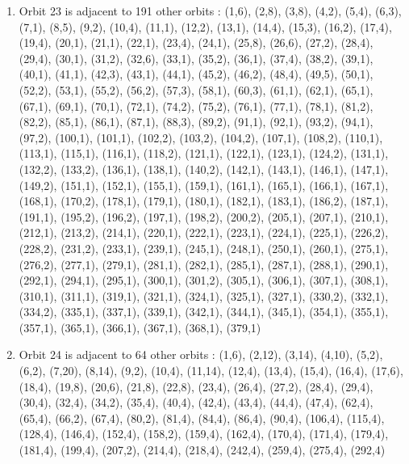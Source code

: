 \documentclass[12pt]{article}
\begin{document}
\begin{enumerate}
\item Orbit 23 is adjacent to 191 other orbits : (1,6), (2,8), (3,8), (4,2), (5,4), (6,3), (7,1), (8,5), (9,2), (10,4), (11,1), (12,2), (13,1), (14,4), (15,3), (16,2), (17,4), (19,4), (20,1), (21,1), (22,1), (23,4), (24,1), (25,8), (26,6), (27,2), (28,4), (29,4), (30,1), (31,2), (32,6), (33,1), (35,2), (36,1), (37,4), (38,2), (39,1), (40,1), (41,1), (42,3), (43,1), (44,1), (45,2), (46,2), (48,4), (49,5), (50,1), (52,2), (53,1), (55,2), (56,2), (57,3), (58,1), (60,3), (61,1), (62,1), (65,1), (67,1), (69,1), (70,1), (72,1), (74,2), (75,2), (76,1), (77,1), (78,1), (81,2), (82,2), (85,1), (86,1), (87,1), (88,3), (89,2), (91,1), (92,1), (93,2), (94,1), (97,2), (100,1), (101,1), (102,2), (103,2), (104,2), (107,1), (108,2), (110,1), (113,1), (115,1), (116,1), (118,2), (121,1), (122,1), (123,1), (124,2), (131,1), (132,2), (133,2), (136,1), (138,1), (140,2), (142,1), (143,1), (146,1), (147,1), (149,2), (151,1), (152,1), (155,1), (159,1), (161,1), (165,1), (166,1), (167,1), (168,1), (170,2), (178,1), (179,1), (180,1), (182,1), (183,1), (186,2), (187,1), (191,1), (195,2), (196,2), (197,1), (198,2), (200,2), (205,1), (207,1), (210,1), (212,1), (213,2), (214,1), (220,1), (222,1), (223,1), (224,1), (225,1), (226,2), (228,2), (231,2), (233,1), (239,1), (245,1), (248,1), (250,1), (260,1), (275,1), (276,2), (277,1), (279,1), (281,1), (282,1), (285,1), (287,1), (288,1), (290,1), (292,1), (294,1), (295,1), (300,1), (301,2), (305,1), (306,1), (307,1), (308,1), (310,1), (311,1), (319,1), (321,1), (324,1), (325,1), (327,1), (330,2), (332,1), (334,2), (335,1), (337,1), (339,1), (342,1), (344,1), (345,1), (354,1), (355,1), (357,1), (365,1), (366,1), (367,1), (368,1), (379,1)
\item Orbit 24 is adjacent to 64 other orbits : (1,6), (2,12), (3,14), (4,10), (5,2), (6,2), (7,20), (8,14), (9,2), (10,4), (11,14), (12,4), (13,4), (15,4), (16,4), (17,6), (18,4), (19,8), (20,6), (21,8), (22,8), (23,4), (26,4), (27,2), (28,4), (29,4), (30,4), (32,4), (34,2), (35,4), (40,4), (42,4), (43,4), (44,4), (47,4), (62,4), (65,4), (66,2), (67,4), (80,2), (81,4), (84,4), (86,4), (90,4), (106,4), (115,4), (128,4), (146,4), (152,4), (158,2), (159,4), (162,4), (170,4), (171,4), (179,4), (181,4), (199,4), (207,2), (214,4), (218,4), (242,4), (259,4), (275,4), (292,4)

\end{enumerate}
\end{document}
